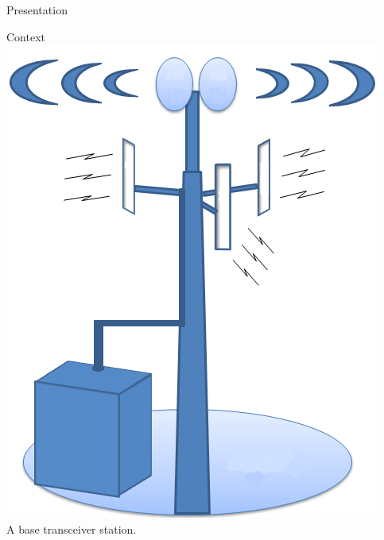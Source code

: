 \documentclass[10 pt]{beamer}
\begin{document}
\begin{section}{Presentation}

\begin{frame}{Context}
  \centering
  \includegraphics[scale=0.2]{bts.png}\\
  A base transceiver station.

\end{frame}



\end{section}
\end{document}
